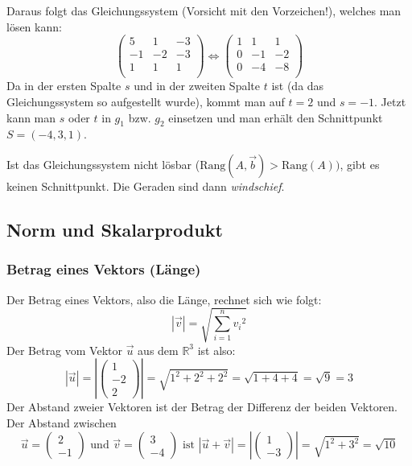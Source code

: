 Daraus folgt das Gleichungssystem (Vorsicht mit den Vorzeichen!),
welches man lösen kann:
\[ \begin {pmatrix}
  5 & 1 & -3 \\
  -1 & -2 & -3 \\
  1 & 1 & 1 \\
\end {pmatrix} \Leftrightarrow \begin {pmatrix}
  1 & 1 & 1 \\
  0 & -1 & -2 \\
  0 & -4 & -8 \\
\end {pmatrix} \]
Da in der ersten Spalte $s$ und in der zweiten Spalte $t$ ist (da das
Gleichungssystem so aufgestellt wurde), kommt man auf $t = 2$ und $s =
-1$. Jetzt kann man $s$ oder $t$ in $g_1$ bzw. $g_2$ einsetzen und man
erhält den Schnittpunkt $S = (-4, 3, 1)$.

Ist das Gleichungssystem nicht lösbar ($\text{Rang}(A,\vec{b}) >
\text{Rang}(A))$, gibt es keinen Schnittpunkt. Die Geraden sind dann
\emph{windschief}.

\subsection{Norm und Skalarprodukt}
\subsubsection{Betrag eines Vektors (Länge)}
Der Betrag eines Vektors, also die Länge, rechnet sich wie folgt:
\[ |\vec{v}| = \sqrt{\sum \limits_{i = 1}^n {v_i}^2} \]
Der Betrag vom Vektor $\vec{u}$ aus dem $\mathbb{R}^3$ ist also:
\[ |\vec{u}| = \left|\left( \begin{array}{c} 1 \\-2 \\2 \end{array}
\right)\right| = \sqrt{1^2 + 2^2 + 2^2} = \sqrt{1 + 4 + 4} = \sqrt{9} = 3 \]
Der Abstand zweier Vektoren ist der Betrag der Differenz der beiden
Vektoren. Der Abstand zwischen 
\[ \vec{u} = \left( \begin{array}{c} 2 \\ -1 \end{array}\right)
\text{ und } \vec{v} = \left( \begin{array}{c} 3 \\ -4 \end{array}\right)
\text{ ist } |\vec{u} + \vec{v}| = \left|\left(\begin{array}{c} 1 \\ -3
\end{array}\right)\right| = \sqrt{1^2 + 3^2} = \sqrt{10} \]

